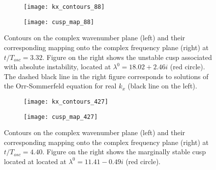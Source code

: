 \begin{figure}
	\centering
	\begin{subfigure}[t]{0.48\textwidth}
		\centering
		\texttt{[image: kx\_contours\_88]}
	\end{subfigure}
	\begin{subfigure}[t]{0.48\textwidth}
		\centering
		\texttt{[image: cusp\_map\_88]}
	\end{subfigure}
	\caption{Contours on the complex wavenumber plane (left) and their corresponding mapping onto the complex frequency plane (right) at $t/T_{osc}=3.32$. Figure on the right shows the unstable cusp associated with absolute instability, located at $\lambda^{0}=18.02+2.46i$ (red circle). The dashed black line in the right figure corresponds to solutions of the Orr-Sommerfeld equation for real $k_{x}$ (black line on the left).}
	\label{fig:bubble_cusp_88}
\end{figure}

\begin{figure}
	\centering
	\begin{subfigure}[t]{0.48\textwidth}
		\centering
		\texttt{[image: kx\_contours\_427]}
	\end{subfigure}
	\begin{subfigure}[t]{0.48\textwidth}
		\centering
		\texttt{[image: cusp\_map\_427]}
	\end{subfigure}
	\caption{Contours on the complex wavenumber plane (left) and their corresponding mapping onto the complex frequency plane (right) at $t/T_{osc}=4.40$. Figure on the right shows the marginally stable cusp located at located at $\lambda^{0}=11.41-0.49i$ (red circle). }
	\label{fig:bubble_cusp_427}
\end{figure}

